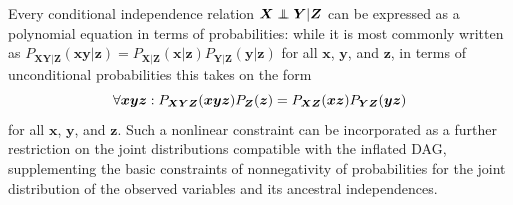 {Every conditional independence relation $\bm{X}\indep\bm{Y}|\bm{Z}$ can be expressed as a polynomial equation in terms of probabilities: while it is most commonly written as $P_{\bm{X}\bm{Y}|\bm{Z}}(\bm{x}\bm{y}|\bm{z})=P_{\bm{X}|\bm{Z}}(\bm{x}|\bm{z})P_{\bm{Y}|\bm{Z}}(\bm{y}|\bm{z})$ for all $\bm{x}$, $\bm{y}$, and $\bm{z}$, in terms of unconditional probabilities this takes on the form
\[
\forall{\bm{x} \bm{y} \bm{z}}: \p[\bm{X}\bm{Y}\bm{Z}]{\bm{x}\bm{y}\bm{z}}\p[\bm{Z}]{\bm{z}}=\p[\bm{X}\bm{Z}]{\bm{x}\bm{z}}\p[\bm{Y}\bm{Z}]{\bm{y}\bm{z}}
\]
for all $\bm{x}$, $\bm{y}$, and $\bm{z}$. Such a nonlinear constraint can be incorporated as a further restriction on the joint distributions compatible with the inflated DAG, supplementing the basic constraints of nonnegativity of probabilities for the joint distribution of the observed variables and its ancestral independences.

}
